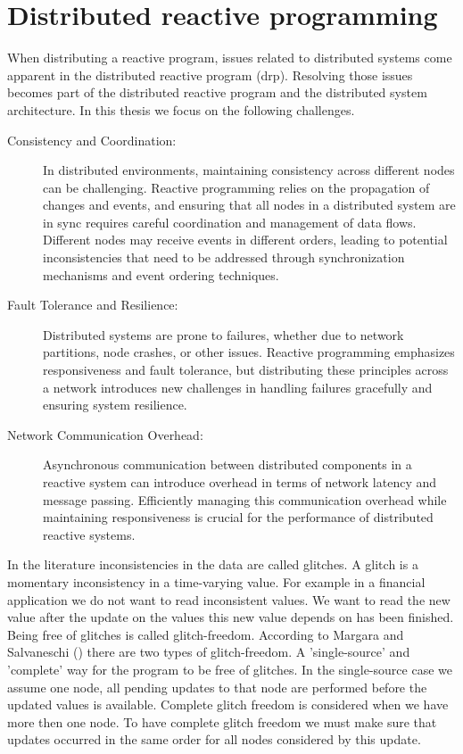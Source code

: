\documentclass[a4paper]{book}
\begin{document}
\section{Distributed reactive programming} \label{sec:drp}



When distributing a reactive program, issues related to distributed systems come apparent in the distributed reactive program (drp). Resolving those issues becomes part of the distributed reactive program and the distributed system architecture. In this thesis we focus on the following challenges.
\begin{description}
	\item[Consistency and Coordination:] In distributed environments, maintaining consistency across different nodes can be challenging. Reactive programming relies on the propagation of changes and events, and ensuring that all nodes in a distributed system are in sync requires careful coordination and management of data flows. Different nodes may receive events in different orders, leading to potential inconsistencies that need to be addressed through synchronization mechanisms and event ordering techniques. 
	\item[Fault Tolerance and Resilience:] Distributed systems are prone to failures, whether due to network partitions, node crashes, or other issues. Reactive programming emphasizes responsiveness and fault tolerance, but distributing these principles across a network introduces new challenges in handling failures gracefully and ensuring system resilience.
	\item[Network Communication Overhead:] Asynchronous communication between distributed components in a reactive system can introduce overhead in terms of network latency and message passing. Efficiently managing this communication overhead while maintaining responsiveness is crucial for the performance of distributed reactive systems.
	
\end{description}

In the literature inconsistencies in the data are called glitches. A glitch is a momentary inconsistency in a time-varying value. For example in a financial application we do not want to read inconsistent values. We want to read the new value after the update on the values this new value depends on has been finished. Being free of glitches is called glitch-freedom. According to Margara and Salvaneschi (\cite{DBLP:journals/tse/MargaraS18}) there are two types of glitch-freedom. A 'single-source' and 'complete' way for the program to be free of glitches. In the single-source case we assume one node, all pending updates to that node are performed before the updated values is available. Complete glitch freedom is considered when we have more then one node. To have complete glitch freedom we must make sure that updates occurred in the same order for all nodes considered by this update. 
\end{document}
